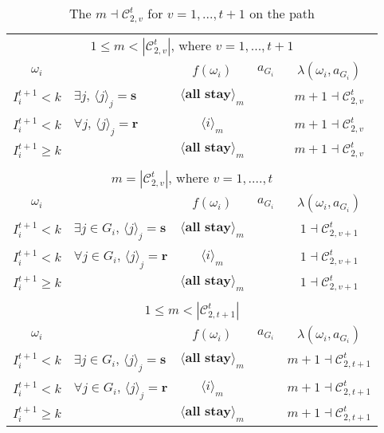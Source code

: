 \documentclass[12pt,letter]{article}
\newcommand{\Kappa}{\mathcal{C}}
\theoremstyle{definition}
\theoremstyle{remark}
\theoremstyle{claim}
\begin{document}
\begin{table}[!htbp]
\caption{The $m\dashv\Kappa^t_{2,v}$ for $v=1,...,t+1$ on the path}
\label{table:eqm_path_kt2}
\begin{center}
\begin{tabular}{c l | c | c | c}
\multicolumn{5}{c}{$1\leq m < |\Kappa^t_{2,v}|$, where $v=1,...,t+1$}\\
$\omega_i$ 	 & 	   &	$f(\omega_i)$  &	$a_{G_i}$ & $\lambda(\omega_i,a_{G_i})$ \\
\hline
\hline
$I^{t+1}_i< k$  	& 	$\exists j$, $\langle j \rangle_j=\textbf{s}$	& $\langle \textbf{all stay} \rangle_m$		&  	& $m+1\dashv \Kappa^t_{2,v}$\\
$I^{t+1}_i< k$  	& 	$\forall j$, $\langle j \rangle_j=\textbf{r}$	& $\langle i \rangle_m$		&  	& $m+1\dashv \Kappa^t_{2,v}$\\
$I^{t+1}_i\geq k$	 & 				& $\langle \textbf{all stay} \rangle_m$ 	& 		& $m+1\dashv \Kappa^t_{2,v}$\\
\hline
\\
\multicolumn{5}{c}{$m= |\Kappa^t_{2,v}|$, where $v=1,....,t$}\\
$\omega_i$ 	 & 	   &	$f(\omega_i)$  &	$a_{G_i}$ & $\lambda(\omega_i,a_{G_i})$ \\
\hline
\hline
$I^{t+1}_i< k$  	& 	$\exists j\in G_i$, $\langle j \rangle_j=\textbf{s}$	& $\langle \textbf{all stay} \rangle_m$		&  	& $1\dashv \Kappa^t_{2,v+1}$\\
$I^{t+1}_i< k$  	& 	$\forall j\in G_i$, $\langle j \rangle_j=\textbf{r}$	& $\langle i \rangle_m$		&  	& $1\dashv \Kappa^t_{2,v+1}$\\
$I^{t+1}_i\geq k$	 & 				& $\langle \textbf{all stay} \rangle_m$ 	& 		& $1\dashv \Kappa^t_{2,v+1}$\\
\hline
\\
\multicolumn{5}{c}{$1\leq m < |\Kappa^t_{2,t+1}|$}\\
$\omega_i$ 	 & 	   &	$f(\omega_i)$  &	$a_{G_i}$ & $\lambda(\omega_i,a_{G_i})$ \\
\hline
\hline
$I^{t+1}_i< k$  	& 	$\exists j\in G_i$, $\langle j \rangle_j=\textbf{s}$	& $\langle \textbf{all stay} \rangle_m$		&  	& $m+1\dashv \Kappa^t_{2,t+1}$\\
$I^{t+1}_i< k$  	& 	$\forall j\in G_i$, $\langle j \rangle_j=\textbf{r}$	& $\langle i \rangle_m$		&  	& $m+1\dashv \Kappa^t_{2,t+1}$\\
$I^{t+1}_i\geq k$	 & 				& $\langle \textbf{all stay} \rangle_m$ 	& 		& $m+1\dashv \Kappa^t_{2,t+1}$\\
\hline

\end{tabular}
\end{center}
\end{table}
\end{document}
